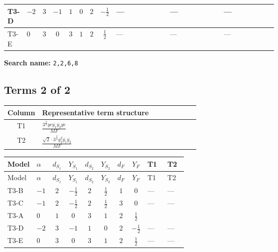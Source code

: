 \documentclass[8pt]{article}
\begin{document}
\begin{landscape}
\begin{longtable}{@{}llcccccc >{\raggedright\arraybackslash}p{0.21\linewidth} >{\raggedright\arraybackslash}p{0.21\linewidth} >{\raggedright\arraybackslash}p{0.21\linewidth}@{}}
\midrule
T3-D & $-2$ & $3$ & $-1$ & $1$ & $0$ & $2$ & $-\frac{1}{2}$ & --- & --- & --- \\
\midrule
T3-E & $0$ & $3$ & $0$ & $3$ & $1$ & $2$ & $\frac{1}{2}$ & --- & --- & --- \\
\midrule
\bottomrule
\end{longtable}
\clearpage
\noindent\textbf{Search name: }\texttt{2,2,6,8}\par\smallskip
\subsection*{Terms 2 of 2}
\begin{center}
\begin{tabular}{@{}c >{\raggedright\arraybackslash}p{0.82\linewidth}@{}}
\toprule
Column & Representative term structure \\
\midrule
T1 & \(\displaystyle \frac{3^{\frac{3}{4}} ye \overline{y_{1}} \overline{y_{2}} \overline{ye}}{MF}\) \\
\midrule
T2 & \(\displaystyle \frac{\sqrt{2} \cdot 3^{\frac{3}{4}} g_{2}^{2} \overline{y_{1}} \overline{y_{2}}}{MF}\) \\
\midrule
\bottomrule
\end{tabular}
\end{center}
\smallskip
\tiny
\begin{longtable}{@{}llcccccc >{\raggedright\arraybackslash}p{0.21\linewidth} >{\raggedright\arraybackslash}p{0.21\linewidth}@{}}
\toprule
Model & $\alpha$ & $d_{S_1}$ & $Y_{S_1}$ & $d_{S_2}$ & $Y_{S_2}$ & $d_F$ & $Y_F$ & T1 & T2 \\
\midrule
\endfirsthead
\toprule
Model & $\alpha$ & $d_{S_1}$ & $Y_{S_1}$ & $d_{S_2}$ & $Y_{S_2}$ & $d_F$ & $Y_F$ & T1 & T2 \\
\midrule
\endhead
T3-B & $-1$ & $2$ & $-\frac{1}{2}$ & $2$ & $\frac{1}{2}$ & $1$ & $0$ & --- & --- \\
\midrule
T3-C & $-1$ & $2$ & $-\frac{1}{2}$ & $2$ & $\frac{1}{2}$ & $3$ & $0$ & --- & --- \\
\midrule
T3-A & $0$ & $1$ & $0$ & $3$ & $1$ & $2$ & $\frac{1}{2}$ & \scriptsize\adjustbox{max width=\linewidth}{$\begin{gathered} - \frac{3^{\frac{3}{4}} ye \overline{y_{1}} \overline{y_{2}} \overline{ye}}{12 MF}\end{gathered}$} & \scriptsize\adjustbox{max width=\linewidth}{$\begin{gathered} \frac{\sqrt{2} \cdot 3^{\frac{3}{4}} g_{2}^{2} \overline{y_{1}} \overline{y_{2}}}{3 MF}\end{gathered}$} \\
\midrule
T3-D & $-2$ & $3$ & $-1$ & $1$ & $0$ & $2$ & $-\frac{1}{2}$ & --- & --- \\
\midrule
T3-E & $0$ & $3$ & $0$ & $3$ & $1$ & $2$ & $\frac{1}{2}$ & --- & --- \\
\midrule
\bottomrule
\end{longtable}
\clearpage

\end{landscape}
\end{document}

